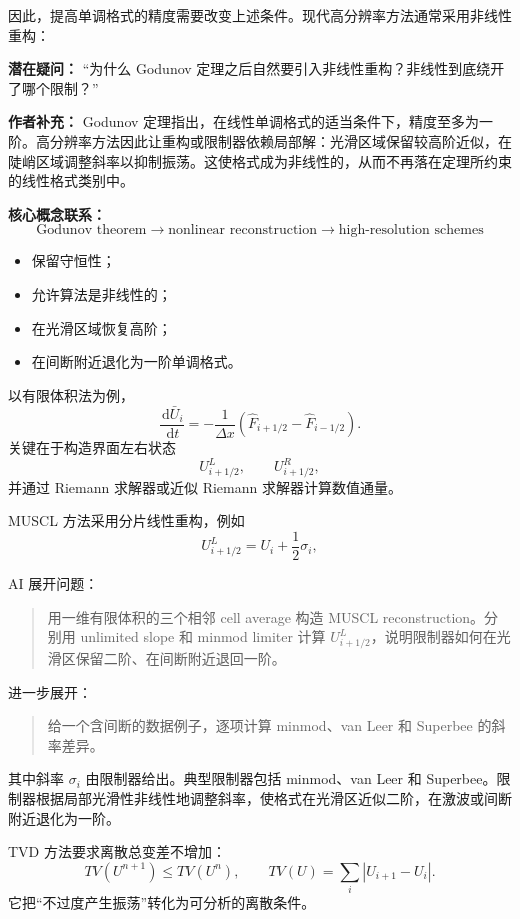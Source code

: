 \documentclass[11pt,openany]{ctexbook}
\newcommand{\dd}{\,\mathrm d}
\begin{document}
因此，提高单调格式的精度需要改变上述条件。现代高分辨率方法通常采用非线性重构：

\begin{authornote}
\textbf{潜在疑问：}
“为什么 Godunov 定理之后自然要引入非线性重构？非线性到底绕开了哪个限制？”

\textbf{作者补充：}
Godunov 定理指出，在线性单调格式的适当条件下，精度至多为一阶。高分辨率方法因此让重构或限制器依赖局部解：光滑区域保留较高阶近似，在陡峭区域调整斜率以抑制振荡。这使格式成为非线性的，从而不再落在定理所约束的线性格式类别中。

\textbf{核心概念联系：}
\[
\text{Godunov theorem}
\longrightarrow
\text{nonlinear reconstruction}
\longrightarrow
\text{high-resolution schemes}
\]
\end{authornote}

\begin{itemize}
  \item 保留守恒性；
  \item 允许算法是非线性的；
  \item 在光滑区域恢复高阶；
  \item 在间断附近退化为一阶单调格式。
\end{itemize}

以有限体积法为例，
\[
\frac{\dd \bar U_i}{\dd t}
=
-\frac{1}{\Delta x}
\left(
\widehat F_{i+1/2}
-
\widehat F_{i-1/2}
\right).
\]
关键在于构造界面左右状态
\[
U_{i+1/2}^{L},
\qquad
U_{i+1/2}^{R},
\]
并通过 Riemann 求解器或近似 Riemann 求解器计算数值通量。

MUSCL 方法采用分片线性重构，例如
\[
U_{i+1/2}^{L}
=
U_i+\frac12\sigma_i,
\]

\begin{askai}
AI 展开问题：
\begin{quote}
用一维有限体积的三个相邻 cell average 构造 MUSCL reconstruction。分别用 unlimited slope 和 minmod limiter 计算 \(U_{i+1/2}^L\)，说明限制器如何在光滑区保留二阶、在间断附近退回一阶。
\end{quote}

进一步展开：
\begin{quote}
给一个含间断的数据例子，逐项计算 minmod、van Leer 和 Superbee 的斜率差异。
\end{quote}
\end{askai}

其中斜率 \(\sigma_i\) 由限制器给出。典型限制器包括 minmod、van Leer 和 Superbee。限制器根据局部光滑性非线性地调整斜率，使格式在光滑区近似二阶，在激波或间断附近退化为一阶。

TVD 方法要求离散总变差不增加：
\[
TV(U^{n+1})\le TV(U^n),
\qquad
TV(U)=\sum_i|U_{i+1}-U_i|.
\]
它把“不过度产生振荡”转化为可分析的离散条件。
\end{document}

